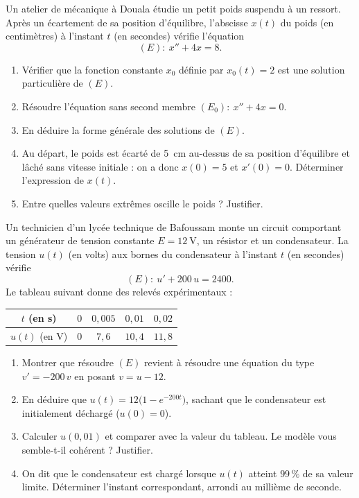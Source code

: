 \documentclass[11pt]{article}
\begin{document}
\begin{exercice}
Un atelier de mécanique à Douala étudie un petit poids suspendu à un ressort. Après un écartement de sa position d'équilibre, l'abscisse $x(t)$ du poids (en centimètres) à l'instant $t$ (en secondes) vérifie l'équation
\[
(E):\ x''+4x=8.
\]
\begin{enumerate}
\item Vérifier que la fonction constante $x_0$ définie par $x_0(t)=2$ est une solution particulière de $(E)$.
\item Résoudre l'équation sans second membre $(E_0):\ x''+4x=0$.
\item En déduire la forme générale des solutions de $(E)$.
\item Au départ, le poids est écarté de \SI{5}{\centi\meter} au-dessus de sa position d'équilibre et lâché sans vitesse initiale : on a donc $x(0)=5$ et $x'(0)=0$. Déterminer l'expression de $x(t)$.
\item Entre quelles valeurs extrêmes oscille le poids ? Justifier.
\end{enumerate}
\end{exercice}

\begin{exercice}
Un technicien d'un lycée technique de Bafoussam monte un circuit comportant un générateur de tension constante $E=\SI{12}{\volt}$, un résistor et un condensateur. La tension $u(t)$ (en volts) aux bornes du condensateur à l'instant $t$ (en secondes) vérifie
\[
(E):\ u'+200\,u=2400.
\]
Le tableau suivant donne des relevés expérimentaux :
\begin{center}
\begin{tabular}{|c|c|c|c|c|}
\hline
$t$ (en s) & $0$ & $0{,}005$ & $0{,}01$ & $0{,}02$ \\
\hline
$u(t)$ (en V) & $0$ & $7{,}6$ & $10{,}4$ & $11{,}8$ \\
\hline
\end{tabular}
\end{center}
\begin{enumerate}
\item Montrer que résoudre $(E)$ revient à résoudre une équation du type $v'=-200\,v$ en posant $v=u-12$.
\item En déduire que $u(t)=12\bigl(1-e^{-200t}\bigr)$, sachant que le condensateur est initialement déchargé ($u(0)=0$).
\item Calculer $u(0{,}01)$ et comparer avec la valeur du tableau. Le modèle vous semble-t-il cohérent ? Justifier.
\item On dit que le condensateur est chargé lorsque $u(t)$ atteint $99\,\%$ de sa valeur limite. Déterminer l'instant correspondant, arrondi au millième de seconde.
\end{enumerate}
\end{exercice}
\end{document}
